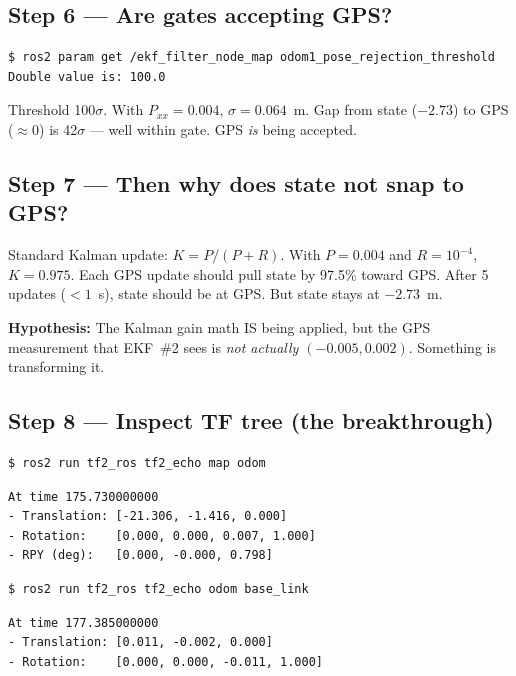 \documentclass[11pt,a4paper]{article}
\begin{document}
\subsection{Step 6 --- Are gates accepting GPS?}

\begin{lstlisting}[language=bash]
$ ros2 param get /ekf_filter_node_map odom1_pose_rejection_threshold
Double value is: 100.0
\end{lstlisting}

\noindent
Threshold 100$\sigma$. With $P_{xx}=0.004$, $\sigma=0.064$~m. Gap from state ($-2.73$) to GPS
($\approx\!0$) is 42$\sigma$ --- well within gate. GPS \emph{is} being accepted.

\subsection{Step 7 --- Then why does state not snap to GPS?}

Standard Kalman update: $K = P / (P+R)$. With $P=0.004$ and $R=10^{-4}$, $K = 0.975$. Each
GPS update should pull state by 97.5\% toward GPS. After 5 updates ($<\!1$~s), state
should be at GPS. But state stays at $-2.73$~m.

\noindent
\textbf{Hypothesis:} The Kalman gain math IS being applied, but the GPS measurement that
EKF~\#2 sees is \emph{not actually $(-0.005, 0.002)$}. Something is transforming it.

\subsection{Step 8 --- Inspect TF tree (the breakthrough)}

\begin{lstlisting}[language=bash]
$ ros2 run tf2_ros tf2_echo map odom
\end{lstlisting}

\begin{lstlisting}
At time 175.730000000
- Translation: [-21.306, -1.416, 0.000]
- Rotation:    [0.000, 0.000, 0.007, 1.000]
- RPY (deg):   [0.000, -0.000, 0.798]
\end{lstlisting}

\begin{lstlisting}[language=bash]
$ ros2 run tf2_ros tf2_echo odom base_link
\end{lstlisting}

\begin{lstlisting}
At time 177.385000000
- Translation: [0.011, -0.002, 0.000]
- Rotation:    [0.000, 0.000, -0.011, 1.000]
\end{lstlisting}
\end{document}
